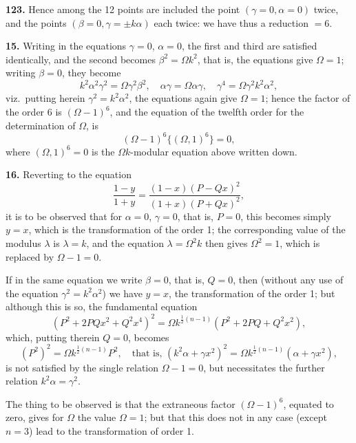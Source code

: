 \documentclass[11pt,a4paper]{book}
\begin{document}
\noindent\textbf{123.} Hence among the 12 points are included the point $(\gamma = 0, \alpha = 0)$ twice, and the points $(\beta = 0, \gamma = \pm k\alpha)$ each twice: we have thus a reduction $= 6$.

\medskip
\noindent\textbf{15.} Writing in the equations $\gamma = 0$, $\alpha = 0$, the first and third are satisfied identically, and the second becomes $\beta^2 = \Omega k^2$, that is, the equations give $\Omega = 1$; writing $\beta = 0$, they become
\[
k^2\alpha^2\gamma^2 = \Omega\gamma^2\beta^2, \quad \alpha\gamma = \Omega\alpha\gamma, \quad \gamma^4 = \Omega\gamma^2k^2\alpha^2,
\]
viz.\ putting herein $\gamma^2 = k^2\alpha^2$, the equations again give $\Omega = 1$; hence the factor of the order 6 is $(\Omega - 1)^6$, and the equation of the twelfth order for the determination of $\Omega$, is
\[
(\Omega - 1)^6\{ (\Omega, 1)^6 \} = 0,
\]
where $(\Omega, 1)^6 = 0$ is the $\Omega k$-modular equation above written down.

\medskip
\noindent\textbf{16.} Reverting to the equation
\[
\frac{1 - y}{1 + y} = \frac{(1 - x)(P - Qx)^2}{(1 + x)(P + Qx)^2},
\]
it is to be observed that for $\alpha = 0$, $\gamma = 0$, that is, $P = 0$, this becomes simply $y = x$, which is the transformation of the order 1; the corresponding value of the modulus $\lambda$ is $\lambda = k$, and the equation $\lambda = \Omega^2k$ then gives $\Omega^2 = 1$, which is replaced by $\Omega - 1 = 0$.

If in the same equation we write $\beta = 0$, that is, $Q = 0$, then (without any use of the equation $\gamma^2 = k^2\alpha^2$) we have $y = x$, the transformation of the order 1; but although this is so, the fundamental equation
\[
(P^2 + 2PQx^2 + Q^2x^4)^2 = \Omega k^{\frac{1}{2}(n-1)}(P^2 + 2PQ + Q^2x^2),
\]
which, putting therein $Q = 0$, becomes
\[
(P^2)^2 = \Omega k^{\frac{1}{2}(n-1)}P^2, \quad \text{that is, } (k^2\alpha + \gamma x^2)^2 = \Omega k^{\frac{1}{2}(n-1)}(\alpha + \gamma x^2),
\]
is not satisfied by the single relation $\Omega - 1 = 0$, but necessitates the further relation $k^2\alpha = \gamma^2$.

The thing to be observed is that the extraneous factor $(\Omega - 1)^6$, equated to zero, gives for $\Omega$ the value $\Omega = 1$; but that this does not in any case (except $n = 3$) lead to the transformation of order 1.
\end{document}
